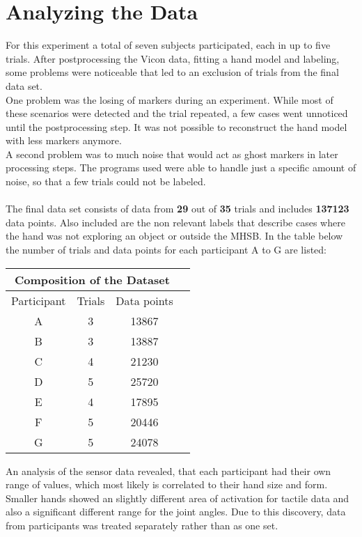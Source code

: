 \section{Analyzing the Data}
For this experiment a total of seven subjects participated, each in up to five trials. After postprocessing the Vicon data, fitting a hand model and labeling, some problems were noticeable that led to an exclusion of trials from the final data set.\\
One problem was the losing of markers during an experiment. While most of these scenarios were detected and the trial repeated, a few cases went unnoticed until the postprocessing step. It was not possible to reconstruct the hand model with less markers anymore.\\
A second problem was to much noise that would act as ghost markers in later processing steps. The programs used were able to handle just a specific amount of noise, so that a few trials could not be labeled.\\
\\
The final data set consists of data from \textbf{29} out of \textbf{35} trials and includes \textbf{137123} data points. Also included are the non relevant labels that describe cases where the hand was not exploring an object or outside the MHSB. In the table below the number of trials and data points for each participant A to G are listed:   

\begin{center}
	\label{database}
	\begin{tabular}{||c||c|c|c}
		\hline
		\multicolumn{3}{|c|}{Composition of the Dataset} \\
		\hline
		Participant & Trials & Data points \\
		\hline\hline
		A & 3 & 13867 \\
		B & 3 & 13887 \\
		C & 4 & 21230 \\
		D & 5 & 25720 \\
		E & 4 & 17895 \\
		F & 5 & 20446 \\
		G & 5 & 24078 \\
		\hline
	\end{tabular}
\end{center} 

An analysis of the sensor data revealed, that each participant had their own range of values, which most likely is correlated to their hand size and form. Smaller hands showed an slightly different area of activation for tactile data and also a significant different range for the joint angles. Due to this discovery, data from participants was treated separately rather than as one set. 
